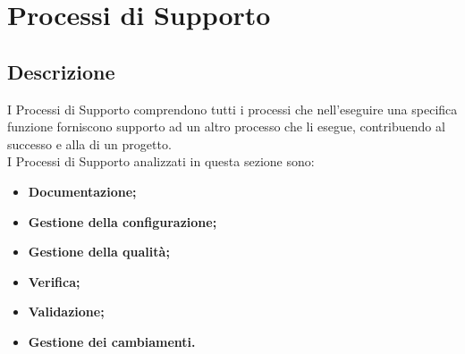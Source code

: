 \section{Processi di Supporto}\label{ProcSup}
\subsection{Descrizione}\label{PSup_Descrizione}
I Processi di Supporto comprendono tutti i processi che nell'eseguire una specifica funzione forniscono supporto ad un altro processo che li esegue, contribuendo al successo e alla  di un progetto. \\
I Processi di Supporto analizzati in questa sezione sono:
\begin{itemize}
	\item \textbf{Documentazione;}
	\item \textbf{Gestione della configurazione;}
	\item \textbf{Gestione della qualità;}
	\item \textbf{Verifica;}
	\item \textbf{Validazione;}
	\item \textbf{Gestione dei cambiamenti.}
\end{itemize}


\newpage

\newpage

\newpage

\newpage

\newpage
